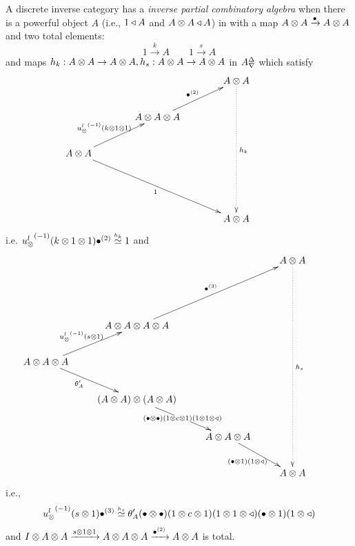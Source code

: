 \begin{definition}\label{def:inverse_partial_combinatory_algebra}
  A discrete inverse category \X has a \emph{inverse partial combinatory algebra} when there is a
  powerful object $A$ (i.e., $1\triangleleft A$ and $A\otimes A \triangleleft A$) in \X with a map $A\otimes A
  \xrightarrow{\bullet} A\otimes A$ and two total elements:
  \[
      1\xrightarrow{k}A \qquad 1\xrightarrow{s}{A}
  \]
  and maps
    $h_k:A\otimes A\to A\otimes A, h_s:A\otimes A\to A\otimes A$  in ${A}^{\Delta}_{\nabla}$ which satisfy
    \[
      \xymatrix@C+15pt{
         && A\*A \ar@{.>}[dddd]^{h_k}\\
        &A\* A\* A \ar[ur]^{\multibullet{2}} & & \\
        A\* A \ar[ur]^{\inv{\usl}(k\*1\*1)} \ar[ddrr]_{1} && &\\
         && & \\
        && A\*A &
      }
    \]
    i.e. ${u_{\otimes}^l}^{(-1)}(k\otimes1\otimes1){\bullet}^{(2)} \overset{\scriptscriptstyle h_k}{\simeq}1$ and
    \[
      \xymatrix{
        &&& A\* A \ar@{.>}[dddddd]^{h_s} \\
        & &  && \\
        &A\* A\* A\* A
          \ar[uurr]^{\multibullet{3}}\\
        A\* A\* A \ar[ur]^{\inv{\usl}(s\*1)} \ar[dr]_(.4){\theta_A'}\\
        &(A\* A) \* (A\* A) \ar[dr]|{(\bullet\*\bullet)(1\*c\*1)(1\*1\*\retract)} \\
        & &A\* A\* A\ar[dr]_{(\bullet\*1)(1\*\retract)}& &\\
        &&&A\*A \\
      }
    \]
    i.e.,
    \[
      {u_{\otimes}^l}^{(-1)}(s\otimes1){\bullet}^{(3)} \overset{\scriptscriptstyle h_s}{\simeq}
      \theta_A'(\bullet\otimes\bullet)(1\otimes c\otimes1)(1\otimes1\otimes\triangleleft)(\bullet\otimes1)(1\otimes\triangleleft)
    \]
    and $I\otimes A\otimes A \xrightarrow{s\otimes1\otimes1} A\otimes A\otimes A \xrightarrow{{\bullet}^{(2)}} A\otimes A$ is total.
\end{definition}




